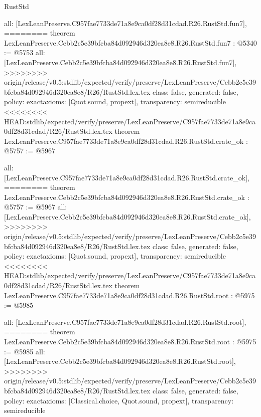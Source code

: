 \begin{lexlean}{RustStd}
\begin{coremodule}
{\begin{coremodule}
{{{{{{{{{{  all: [LexLeanPreserve.C957fae7733de71a8e9ca0df28d31cdad.R26.RustStd.fun7],
========
theorem LexLeanPreserve.Cebb2c5e39bfcba84d092946d320ea8e8.R26.RustStd.fun7 : @5340 := @5753 {
  all: [LexLeanPreserve.Cebb2c5e39bfcba84d092946d320ea8e8.R26.RustStd.fun7],
>>>>>>>> origin/release/v0.5:stdlib/expected/verify/preserve/LexLeanPreserve/Cebb2c5e39bfcba84d092946d320ea8e8/R26/RustStd.lex.tex
  class: false,
  generated: false,
  policy: exact{axioms: [Quot.sound, propext]},
  transparency: semireducible
}
<<<<<<<< HEAD:stdlib/expected/verify/preserve/LexLeanPreserve/C957fae7733de71a8e9ca0df28d31cdad/R26/RustStd.lex.tex
theorem LexLeanPreserve.C957fae7733de71a8e9ca0df28d31cdad.R26.RustStd.crate_ok : @5757 := @5967 {
  all: [LexLeanPreserve.C957fae7733de71a8e9ca0df28d31cdad.R26.RustStd.crate_ok],
========
theorem LexLeanPreserve.Cebb2c5e39bfcba84d092946d320ea8e8.R26.RustStd.crate_ok : @5757 := @5967 {
  all: [LexLeanPreserve.Cebb2c5e39bfcba84d092946d320ea8e8.R26.RustStd.crate_ok],
>>>>>>>> origin/release/v0.5:stdlib/expected/verify/preserve/LexLeanPreserve/Cebb2c5e39bfcba84d092946d320ea8e8/R26/RustStd.lex.tex
  class: false,
  generated: false,
  policy: exact{axioms: [Quot.sound, propext]},
  transparency: semireducible
}
<<<<<<<< HEAD:stdlib/expected/verify/preserve/LexLeanPreserve/C957fae7733de71a8e9ca0df28d31cdad/R26/RustStd.lex.tex
theorem LexLeanPreserve.C957fae7733de71a8e9ca0df28d31cdad.R26.RustStd.root : @5975 := @5985 {
  all: [LexLeanPreserve.C957fae7733de71a8e9ca0df28d31cdad.R26.RustStd.root],
========
theorem LexLeanPreserve.Cebb2c5e39bfcba84d092946d320ea8e8.R26.RustStd.root : @5975 := @5985 {
  all: [LexLeanPreserve.Cebb2c5e39bfcba84d092946d320ea8e8.R26.RustStd.root],
>>>>>>>> origin/release/v0.5:stdlib/expected/verify/preserve/LexLeanPreserve/Cebb2c5e39bfcba84d092946d320ea8e8/R26/RustStd.lex.tex
  class: false,
  generated: false,
  policy: exact{axioms: [Classical.choice, Quot.sound, propext]},
  transparency: semireducible
}

}}}}}}}}}}}}
\end{coremodule}}
\end{coremodule}
\end{lexlean}
